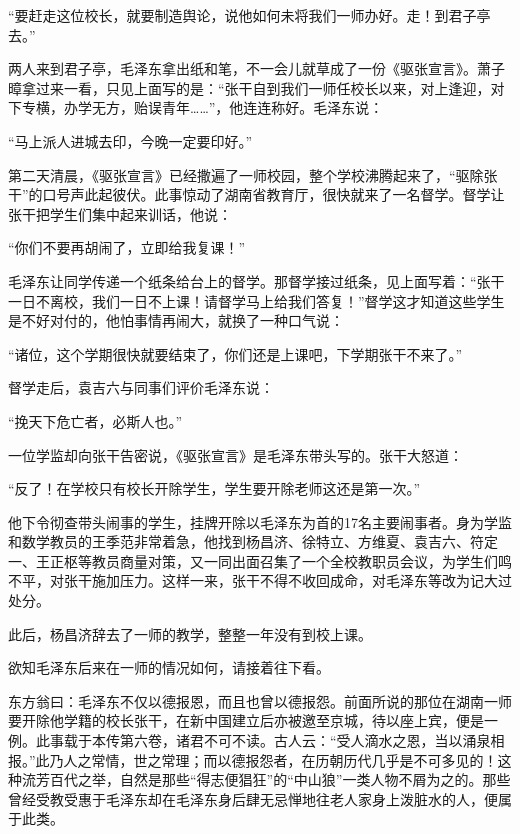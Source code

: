 \documentclass[../../dazhuan.tex]{subfiles}
\begin{document}
“要赶走这位校长，就要制造舆论，说他如何未将我们一师办好。走！到君子亭去。”

两人来到君子亭，毛泽东拿出纸和笔，不一会儿就草成了一份《驱张宣言》。萧子暲拿过来一看，只见上面写的是：“张干自到我们一师任校长以来，对上逢迎，对下专横，办学无方，贻误青年……”，他连连称好。毛泽东说：

“马上派人进城去印，今晚一定要印好。”

第二天清晨，《驱张宣言》已经撒遍了一师校园，整个学校沸腾起来了，“驱除张干”的口号声此起彼伏。此事惊动了湖南省教育厅，很快就来了一名督学。督学让张干把学生们集中起来训话，他说：

“你们不要再胡闹了，立即给我复课！”

毛泽东让同学传递一个纸条给台上的督学。那督学接过纸条，见上面写着：“张干一日不离校，我们一日不上课！请督学马上给我们答复！”督学这才知道这些学生是不好对付的，他怕事情再闹大，就换了一种口气说：

“诸位，这个学期很快就要结束了，你们还是上课吧，下学期张干不来了。”

督学走后，袁吉六与同事们评价毛泽东说：

“挽天下危亡者，必斯人也。”

一位学监却向张干告密说，《驱张宣言》是毛泽东带头写的。张干大怒道：

“反了！在学校只有校长开除学生，学生要开除老师这还是第一次。”

他下令彻查带头闹事的学生，挂牌开除以毛泽东为首的17名主要闹事者。身为学监和数学教员的王季范非常着急，他找到杨昌济、徐特立、方维夏、袁吉六、符定一、王正枢等教员商量对策，又一同出面召集了一个全校教职员会议，为学生们鸣不平，对张干施加压力。这样一来，张干不得不收回成命，对毛泽东等改为记大过处分。

此后，杨昌济辞去了一师的教学，整整一年没有到校上课。

欲知毛泽东后来在一师的情况如何，请接着往下看。

东方翁曰：毛泽东不仅以德报恩，而且也曾以德报怨。前面所说的那位在湖南一师要开除他学籍的校长张干，在新中国建立后亦被邀至京城，待以座上宾，便是一例。此事载于本传第六卷，诸君不可不读。古人云：“受人滴水之恩，当以涌泉相报。”此乃人之常情，世之常理；而以德报怨者，在历朝历代几乎是不可多见的！这种流芳百代之举，自然是那些“得志便猖狂”的“中山狼”一类人物不屑为之的。那些曾经受教受惠于毛泽东却在毛泽东身后肆无忌惮地往老人家身上泼脏水的人，便属于此类。
\end{document}
